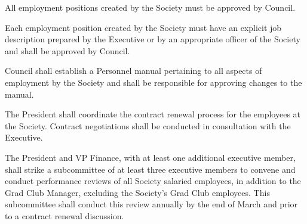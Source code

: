 \begin{longenum}[ label*=\thesection.\arabic*., align=left]
	\item All employment positions created by the Society must be approved by Council.
    \item Each employment position created by the Society must have an explicit job description prepared by the Executive or by an appropriate officer of the Society and shall be approved by Council. 
    \item Council shall establish a Personnel manual pertaining to all aspects of employment by the Society and shall be responsible for approving changes to the manual.
    \item The President shall coordinate the contract renewal process for the employees at the Society. Contract negotiations shall be conducted in consultation with the Executive.
    \item The President and VP Finance, with at least one additional executive member, shall strike a subcommittee of at least three executive members to convene and conduct performance reviews of all Society salaried employees, in addition to the Grad Club Manager, excluding the Society's Grad Club employees. This subcommittee shall conduct this review annually by the end of March and prior to a contract renewal discussion.
\end{longenum}

\newpage

